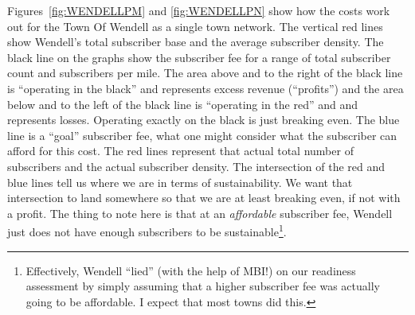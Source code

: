 \documentclass[12pt]{article}
\begin{document}
\clearpage

Figures~\ref{fig:WENDELLPM} and \ref{fig:WENDELLPN} show how the costs work
out for the Town Of Wendell as a single town network. The vertical red lines
show Wendell's total subscriber base and the average subscriber density. The
black line on the graphs show the subscriber fee for a range of total
subscriber count and subscribers per mile. The area above and to the right of
the black line is ``operating in the black'' and represents excess revenue
(``profits'') and the area below and to the left of the black line is
``operating in the red'' and and represents losses. Operating exactly on the
black is just breaking even. The blue line is a ``goal'' subscriber fee, what
one might consider what the subscriber can afford for this cost. The red lines
represent that actual total number of subscribers and the actual subscriber
density. The intersection of the red and blue lines tell us where we are in
terms of sustainability. We want that intersection to land somewhere so that we
are at least breaking even, if not with a profit. The thing to note here is
that at an \textit{affordable} subscriber fee, Wendell just does not have
enough subscribers to be sustainable\footnote{Effectively, Wendell ``lied''
(with the help of MBI!) on our readiness assessment by simply assuming that a
higher subscriber fee was actually going to be affordable. I expect that most
towns did this.}.
\end{document}

